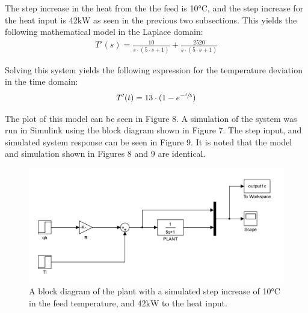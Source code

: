 \documentclass{article}
\begin{document}
The step increase in the heat from the the feed is 10$\si{\degreeCelsius}$, and the step increase for the heat input is 42$\si{\kilo\watt}$ as seen in the previous two subsections. This yields the following mathematical model in the Laplace domain:
\begin{align}
T'(s) = \frac{10}{s \cdot (5 \cdot s + 1)} + \frac{2520}{s \cdot (5 \cdot s + 1)}
\end{align}

Solving this system yields the following expression for the temperature deviation in the time domain:
\begin{align}
T'(t) = 13 \cdot (1 - e^{-\sfrac{t}{5}})
\end{align}

The plot of this model can be seen in Figure 8. A simulation of the system was run in Simulink using the block diagram shown in Figure 7. The step input, and simulated system response can be seen in Figure 9. It is noted that the model and simulation shown in Figures 8 and 9 are identical.

\begin{figure}[h]
\centering
\includegraphics[scale=0.15]{block_1c}
\caption{A block diagram of the plant with a simulated step increase of 10$\si{\degreeCelsius}$ in the feed temperature, and 42$\si{\kilo\watt}$ to the heat input.}
\end{figure}
\end{document}

